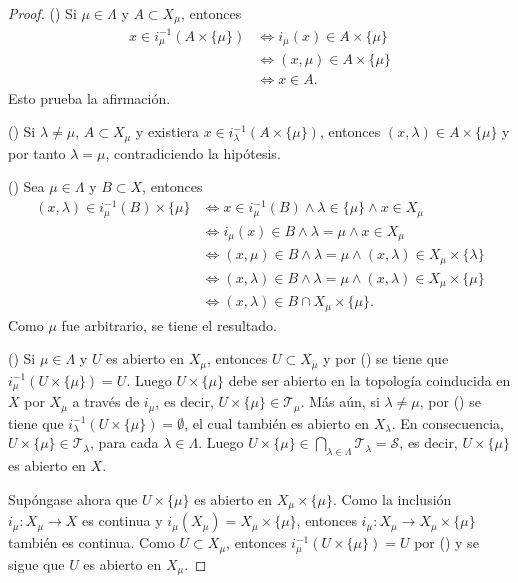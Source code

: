 \begin{proof}
({\scshape{}}) Si $\mu \in \Lambda$ y $A \subset X_{\mu}$, entonces
\begin{align*}
    x \in i^{-1}_{\mu}(A \times \{ \mu \}) & \iff i_{\mu}(x) \in A \times \{ \mu \} \\
                                           & \iff (x, \mu) \in A \times \{ \mu \} \\
                                           & \iff x \in A.
\end{align*}
Esto prueba la afirmación.
\bigskip

({\scshape{}}) Si $\lambda \ne \mu$, $A \subset X_{\mu}$ y existiera $x \in i^{-1}_{\lambda}(A \times \{ \mu \})$, entonces $(x,\lambda) \in A \times \{ \mu \}$ y por tanto $\lambda = \mu$, contradiciendo la hipótesis.
\bigskip

({\scshape{}}) Sea $\mu \in \Lambda$ y $B \subset X$, entonces
\begin{align*}
    (x,\lambda) \in i^{-1}_{\mu}(B) \times \{ \mu \} & \iff x \in i^{-1}_{\mu}(B) \land \lambda \in \{ \mu \} \land x \in X_{\mu}  \\
                                                     & \iff i_{\mu}(x) \in B \land \lambda = \mu \land x \in X_{\mu} \\
                                                     & \iff (x,\mu) \in B \land \lambda = \mu \land (x, \lambda) \in X_{\mu} \times \{ \lambda \}  \\
                                                     & \iff (x,\lambda) \in B \land \lambda = \mu \land (x, \lambda) \in X_{\mu} \times \{ \mu \} \\
                                                     & \iff (x,\lambda) \in B \cap X_{\mu} \times \{ \mu \}.
\end{align*}
Como $\mu$ fue arbitrario, se tiene el resultado.
\bigskip

({\scshape{}}) Si $\mu \in \Lambda$ y $U$ es abierto en $X_{\mu}$, entonces $U \subset X_{\mu}$ y por ({\scshape{}}) se tiene que $i^{-1}_{\mu}(U \times \{ \mu \}) = U$. Luego $U \times \{ \mu \}$ debe ser abierto en la topología coinducida en $X$ por $X_{\mu}$ a través de $i_{\mu}$, es decir, $U \times \{ \mu \} \in \mathcal{T}_{\mu}$. Más aún, si $\lambda \ne \mu$, por ({\scshape{}}) se tiene que $i^{-1}_{\lambda}(U \times \{ \mu \}) = \emptyset$, el cual también es abierto en $X_{\lambda}$. En consecuencia, $U \times \{ \mu \} \in \mathcal{T}_{\lambda}$, para cada $\lambda \in \Lambda$. Luego $U \times \{ \mu \} \in \bigcap_{\lambda \in \Lambda} \mathcal{T}_{\lambda} = \mathcal{S}$, es decir, $U \times \{ \mu \}$ es abierto en $X$.
\bigskip

Supóngase ahora que $U \times \{ \mu \}$ es abierto en $X_{\mu} \times \{ \mu \}$. Como la inclusión $i_{\mu} : X_{\mu} \longrightarrow X$ es continua y $i_{\mu}(X_{\mu}) = X_{\mu} \times \{ \mu \}$, entonces $i_{\mu} : X_{\mu} \longrightarrow X_{\mu} \times \{ \mu \}$ también es continua. Como $U \subset X_{\mu}$, entonces $i^{-1}_{\mu}(U \times \{ \mu \}) = U$ por ({\scshape{}}) y se sigue que $U$ es abierto en $X_{\mu}$.
\end{proof}
